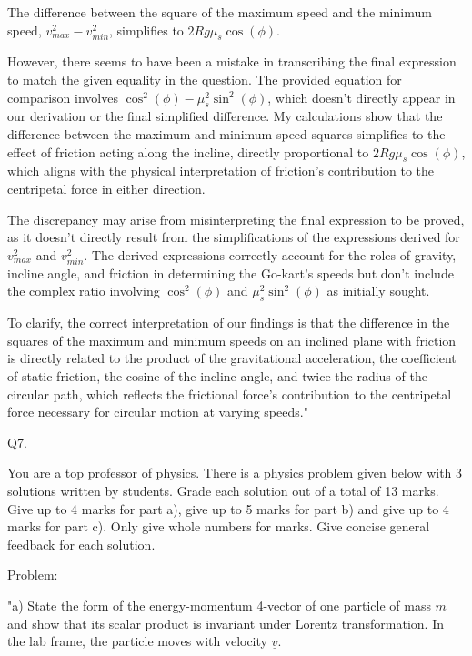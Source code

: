 The difference between the square of the maximum speed and the minimum speed, \(v_{max}^{2} - v_{min}^{2}\), simplifies to \(2Rg\mu_{s}\cos(\phi)\).

However, there seems to have been a mistake in transcribing the final expression to match the given equality in the question. The provided equation for comparison involves \(\cos^{2}(\phi) - \mu_{s}^{2}\sin^{2}(\phi)\), which doesn't directly appear in our derivation or the final simplified difference. My calculations show that the difference between the maximum and minimum speed squares simplifies to the effect of friction acting along the incline, directly proportional to \(2Rg\mu_{s}\cos(\phi)\), which aligns with the physical interpretation of friction's contribution to the centripetal force in either direction.

The discrepancy may arise from misinterpreting the final expression to be proved, as it doesn't directly result from the simplifications of the expressions derived for \(v_{max}^2\) and \(v_{min}^2\). The derived expressions correctly account for the roles of gravity, incline angle, and friction in determining the Go-kart's speeds but don't include the complex ratio involving \(\cos^2(\phi)\) and \(\mu_s^2\sin^2(\phi)\) as initially sought. 

To clarify, the correct interpretation of our findings is that the difference in the squares of the maximum and minimum speeds on an inclined plane with friction is directly related to the product of the gravitational acceleration, the coefficient of static friction, the cosine of the incline angle, and twice the radius of the circular path, which reflects the frictional force's contribution to the centripetal force necessary for circular motion at varying speeds."



                           Q7. 

You are a top professor of physics. There is a physics problem given below with 3 solutions written by students. Grade each solution out of a total of 13 marks. Give up to 4 marks for part a), give up to 5 marks for part b) and give up to 4 marks for part c). Only give whole numbers for marks. Give concise general feedback for each solution.

Problem:

"a) State the form of the energy-momentum 4-vector of one particle of mass \( m \) and show that its scalar product is invariant under Lorentz transformation. In the lab frame, the particle moves with velocity \( \underline{v} \). 

